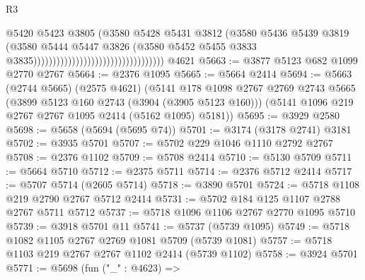 \begin{lexlean}{R3}
\begin{coremodule}
                                                                @5420
                                                                @5423
                                                                @3805
                                                                (@3580
                                                                  @5428
                                                                  @5431
                                                                  @3812
                                                                  (@3580
                                                                    @5436
                                                                    @5439
                                                                    @3819
                                                                    (@3580
                                                                      @5444
                                                                      @5447
                                                                      @3826
                                                                      (@3580
                                                                        @5452
                                                                        @5455
                                                                        @3833
                                                                        @3835))))))))))))))))))))))))))))))))))
    @4621
@5663 := @3877 @5123 @682 @1099 @2770 @2767
@5664 := @2376 @1095
@5665 := @5664 @2414
@5694 := @5663
    (@2744 @5665)
    (@2575 @4621)
    (@5141
      @178
      @1098
      @2767
      @2769
      @2743
      @5665
      (@3899 @5123 @160 @2743 (@3904 (@3905 @5123 @160)))
      (@5141 @1096 @219 @2767 @2767 @1095 @2414 (@5162 @1095) @5181))
@5695 := @3929 @2580
@5698 := @5658 (@5694 (@5695 @74))
@5701 := @3174 (@3178 @2741) @3181
@5702 := @3935 @5701
@5707 := @5702 @229 @1046 @1110 @2792 @2767
@5708 := @2376 @1102
@5709 := @5708 @2414
@5710 := @5130 @5709
@5711 := @5664 @5710
@5712 := @2375 @5711
@5714 := @2376 @5712 @2414
@5717 := @5707 @5714 (@2605 @5714)
@5718 := @3890 @5701
@5724 := @5718 @1108 @219 @2790 @2767 @5712 @2414
@5731 := @5702 @184 @125 @1107 @2788 @2767 @5711 @5712
@5737 := @5718 @1096 @1106 @2767 @2770 @1095 @5710
@5739 := @3918 @5701 @11
@5741 := @5737 (@5739 @1095)
@5749 := @5718 @1082 @1105 @2767 @2769 @1081 @5709 (@5739 @1081)
@5757 := @5718 @1103 @219 @2767 @2767 @1102 @2414 (@5739 @1102)
@5758 := @3924 @5701
@5771 := @5698
    (fun ("_" : @4623) =>

\end{coremodule}
\end{lexlean}
